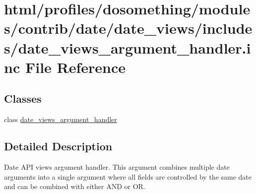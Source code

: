 \hypertarget{date__views__argument__handler_8inc}{
\section{html/profiles/dosomething/modules/contrib/date/date\_\-views/includes/date\_\-views\_\-argument\_\-handler.inc File Reference}
\label{date__views__argument__handler_8inc}
}
\subsection*{Classes}
\begin{DoxyCompactItemize}
\item 
class \hyperlink{classdate__views__argument__handler}{date\_\-views\_\-argument\_\-handler}
\end{DoxyCompactItemize}


\subsection{Detailed Description}
Date API views argument handler. This argument combines multiple date arguments into a single argument where all fields are controlled by the same date and can be combined with either AND or OR. 